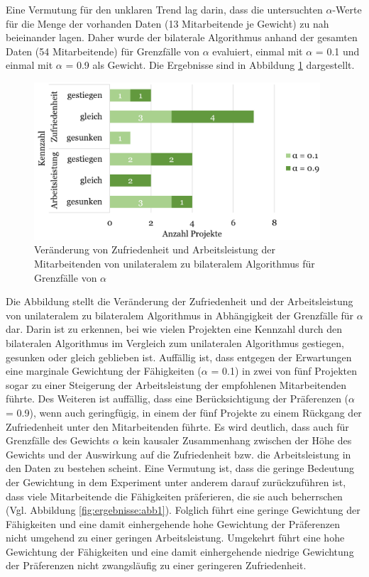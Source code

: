 Eine Vermutung für den unklaren Trend lag darin, dass die untersuchten $\alpha$-Werte für die Menge der vorhanden Daten (13 Mitarbeitende je Gewicht) zu nah beieinander lagen.
Daher wurde der bilaterale Algorithmus anhand der gesamten Daten (54 Mitarbeitende) für Grenzfälle von $\alpha$ evaluiert, einmal mit $\alpha$ = 0.1 und einmal mit $\alpha$ = 0.9 als Gewicht.
Die Ergebnisse sind in Abbildung \ref{fig:diskussion:abb1} dargestellt.

\begin{figure}[H]
    \centering
	\includegraphics[width=0.95\textwidth]{gfx/verhaeltnis-z-a-projekte-edge-cases.png}
	\caption[Veränderung von Zufriedenheit und Arbeitsleistung der Mitarbeitenden von unilateralem zu bilateralem Algorithmus für Grenzfälle von $\alpha$]{Veränderung von Zufriedenheit und Arbeitsleistung der Mitarbeitenden von unilateralem zu bilateralem Algorithmus für Grenzfälle von $\alpha$}
	\label{fig:diskussion:abb1}
\end{figure}

Die Abbildung stellt die Veränderung der Zufriedenheit und der Arbeitsleistung von unilateralem zu bilateralem Algorithmus in Abhängigkeit der Grenzfälle für $\alpha$ dar.
Darin ist zu erkennen, bei wie vielen Projekten eine Kennzahl durch den bilateralen Algorithmus im Vergleich zum unilateralen Algorithmus gestiegen, gesunken oder gleich geblieben ist.
Auffällig ist, dass entgegen der Erwartungen eine marginale Gewichtung der Fähigkeiten ($\alpha$ = 0.1) in zwei von fünf Projekten sogar zu einer Steigerung der Arbeitsleistung der empfohlenen Mitarbeitenden führte.
Des Weiteren ist auffällig, dass eine Berücksichtigung der Präferenzen ($\alpha$ = 0.9), wenn auch geringfügig, in einem der fünf Projekte zu einem Rückgang der Zufriedenheit unter den Mitarbeitenden führte.
Es wird deutlich, dass auch für Grenzfälle des Gewichts $\alpha$ kein kausaler Zusammenhang zwischen der Höhe des Gewichts und der Auswirkung auf die Zufriedenheit bzw. die Arbeitsleistung in den Daten zu bestehen scheint.
Eine Vermutung ist, dass die geringe Bedeutung der Gewichtung in dem Experiment unter anderem darauf zurückzuführen ist, dass viele Mitarbeitende die Fähigkeiten präferieren, die sie auch beherrschen (Vgl. Abbildung \ref{fig:ergebnisse:abb1}).
Folglich führt eine geringe Gewichtung der Fähigkeiten und eine damit einhergehende hohe Gewichtung der Präferenzen nicht umgehend zu einer geringen Arbeitsleistung.
Umgekehrt führt eine hohe Gewichtung der Fähigkeiten und eine damit einhergehende niedrige Gewichtung der Präferenzen nicht zwangsläufig zu einer geringeren Zufriedenheit.

